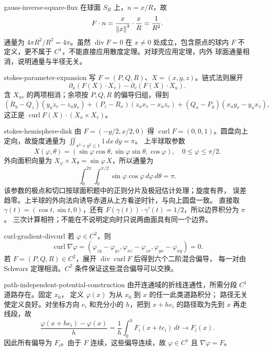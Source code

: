 \begin{solution}{gauss-inverse-square-flux}
在球面 \(S_R\) 上，\(n=x/R\)，故
\[
 F\cdot n
 =\frac{x}{\left\lVert x\right\rVert^3}\cdot\frac{x}{R}
 =\frac1{R^2}.
\]
通量为 \(4\pi R^2/R^2=4\pi\)。虽然
\(\operatorname{div}F=0\) 在 \(x\ne0\) 处成立，包含原点的球内 \(F\)
不定义，更不属于 \(C^1\)，不能直接应用散度定理。对球壳应用定理，内外
球面通量相消，说明通量与半径无关。
\end{solution}

\begin{solution}{stokes-parameter-expansion}
写 \(F=(P,Q,R)\)、\(X=(x,y,z)\)。链式法则展开
\[
 \partial_u(F(X)\cdot X_v)-\partial_v(F(X)\cdot X_u).
\]
含 \(X_{uv}\) 的两项相消；余项按 \(P,Q,R\) 的偏导归组，得到
\[
 (R_y-Q_z)(y_uz_v-z_uy_v)
 +(P_z-R_x)(z_ux_v-x_uz_v)
 +(Q_x-P_y)(x_uy_v-y_ux_v),
\]
这正是 \(\operatorname{curl}F(X)\cdot(X_u\times X_v)\)。
\end{solution}

\begin{solution}{stokes-hemisphere-disk}
由 \(F=(-y/2,x/2,0)\) 得 \(\operatorname{curl}F=(0,0,1)\)。圆盘向上
定向，故旋度通量为 $\iint_{x^2+y^2\le1}1\,dx\,dy=\pi$。
上半球取参数
\[
 X(\varphi,\theta)=(\sin\varphi\cos\theta,
 \sin\varphi\sin\theta,\cos\varphi),
 \quad 0\le\varphi\le\pi/2.
\]
外向面积向量为 $X_\varphi\times X_\theta=\sin\varphi\,X$，所以通量为
\[
 \int_0^{2\pi}\int_0^{\pi/2}\sin\varphi\cos\varphi\,d\varphi\,d\theta
 =\pi.
\]
该参数的极点和切口按球面积题中的正则分片及极冠估计处理；旋度有界，
误差趋零。上半球的外向法向诱导赤道从上方看逆时针，与向上圆盘一致。
直接取 $\gamma(t)=(\cos t,\sin t,0)$，还有
$F(\gamma(t))\cdot\gamma'(t)=1/2$，所以边界积分为 $\pi$。
三次计算相符；不能在不说明定向时只说两曲面具有同一个边界。
\end{solution}

\begin{solution}{curl-gradient-divcurl}
若 \(\varphi\in C^2\)，则
\[
 \operatorname{curl}\nabla\varphi
 =(\varphi_{zy}-\varphi_{yz},
   \varphi_{xz}-\varphi_{zx},
   \varphi_{yx}-\varphi_{xy})=0.
\]
若 \(F=(P,Q,R)\in C^2\)，展开
\(\operatorname{div}\operatorname{curl}F\) 后得到六个二阶混合偏导，
每一对由 Schwarz 定理相消。\(C^2\) 条件保证这些混合偏导可以交换。
\end{solution}

\begin{solution}{path-independent-potential-construction}
由开连通域的折线连通性，所需分段 $C^1$ 道路存在。固定 \(x_0\)，
定义 \(\varphi(x)\) 为从 \(x_0\) 到 \(x\) 的任一此类道路积分；
路径无关使定义良好。对坐标方向 \(e_i\) 和充分小的 \(h\)，把到
\(x+he_i\) 的路径取为先到 \(x\) 再走线段，故
\[
 \frac{\varphi(x+he_i)-\varphi(x)}h
 =\frac1h\int_0^hF_i(x+te_i)\,dt
 \longrightarrow F_i(x).
\]
因此所有偏导为 \(F_i\)。由于 \(F\) 连续，这些偏导连续，故
\(\varphi\in C^1\) 且 \(\nabla\varphi=F\)。
\end{solution}

